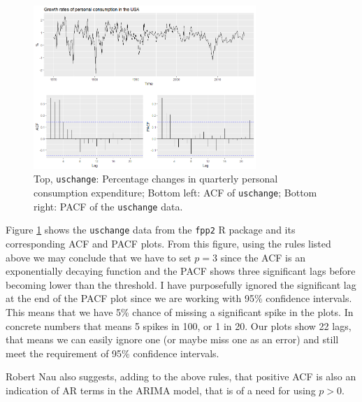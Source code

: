 \documentclass[12pt,a4paper,titlepage]{report}
\begin{document}
\begin{figure}[h]
    \centering
    \includegraphics[width=0.75\textwidth]{duschangeacfpacf}
    \caption{Top, \texttt{uschange}: Percentage changes in quarterly personal consumption expenditure; Bottom left: ACF of \texttt{uschange}; Bottom right: PACF of the \texttt{uschange} data.}
    \label{uschangeacfpacf}
\end{figure}

Figure \ref{uschangeacfpacf} shows the \texttt{uschange} data from the \texttt{fpp2} R package \cite{fpp2} and its corresponding ACF and PACF plots. From this figure, using the rules listed above we may conclude that we have to set $ p = 3 $ since the ACF is an exponentially decaying function and the PACF shows three significant lags before becoming lower than the threshold. I have purposefully ignored the significant lag at the end of the PACF plot since we are working with 95\% confidence intervals. This means that we have 5\% chance of missing a significant spike in the plots. In concrete numbers that means 5 spikes in 100, or 1 in 20. Our plots show 22 lags, that means we can easily ignore one (or maybe miss one as an error) and still meet the requirement of 95\% confidence intervals.

Robert Nau also suggests, adding to the above rules, that positive ACF is also an indication of AR terms in the ARIMA model, that is of a need for using $ p > 0 $. \cite{nauarimaarmarules}
\end{document}
